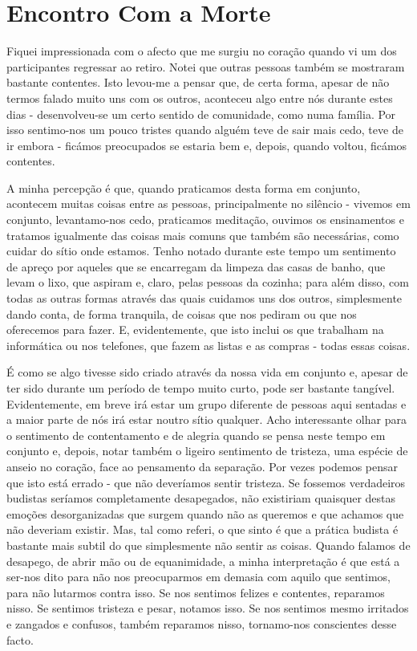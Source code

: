\chapter{Encontro Com a Morte}

Fiquei impressionada com o afecto que me surgiu no coração quando vi um
dos participantes regressar ao retiro. Notei que outras pessoas também
se mostraram bastante contentes. Isto levou-me a pensar que, de certa
forma, apesar de não termos falado muito uns com os outros, aconteceu
algo entre nós durante estes dias - desenvolveu-se um certo sentido de
comunidade, como numa família. Por isso sentimo-nos um pouco tristes
quando alguém teve de sair mais cedo, teve de ir embora - ficámos
preocupados se estaria bem e, depois, quando voltou, ficámos contentes.

A minha percepção é que, quando praticamos desta forma em conjunto,
acontecem muitas coisas entre as pessoas, principalmente no silêncio -
vivemos em conjunto, levantamo-nos cedo, praticamos meditação, ouvimos
os ensinamentos e tratamos igualmente das coisas mais comuns que também
são necessárias, como cuidar do sítio onde estamos. Tenho notado durante
este tempo um sentimento de apreço por aqueles que se encarregam da
limpeza das casas de banho, que levam o lixo, que aspiram e, claro,
pelas pessoas da cozinha; para além disso, com todas as outras formas
através das quais cuidamos uns dos outros, simplesmente dando conta, de
forma tranquila, de coisas que nos pediram ou que nos oferecemos para
fazer. E, evidentemente, que isto inclui os que trabalham na informática
ou nos telefones, que fazem as listas e as compras - todas essas coisas.

É como se algo tivesse sido criado através da nossa vida em conjunto e,
apesar de ter sido durante um período de tempo muito curto, pode ser
bastante tangível. Evidentemente, em breve irá estar um grupo diferente
de pessoas aqui sentadas e a maior parte de nós irá estar noutro sítio
qualquer. Acho interessante olhar para o sentimento de contentamento e
de alegria quando se pensa neste tempo em conjunto e, depois, notar
também o ligeiro sentimento de tristeza, uma espécie de anseio no
coração, face ao pensamento da separação. Por vezes podemos pensar que
isto está errado - que não deveríamos sentir tristeza. Se fossemos
verdadeiros budistas seríamos completamente desapegados, não existiriam
quaisquer destas emoções desorganizadas que surgem quando não as
queremos e que achamos que não deveriam existir. Mas, tal como referi, o
que sinto é que a prática budista é bastante mais subtil do que
simplesmente não sentir as coisas. Quando falamos de desapego, de abrir
mão ou de equanimidade, a minha interpretação é que está a ser-nos dito
para não nos preocuparmos em demasia com aquilo que sentimos, para não
lutarmos contra isso. Se nos sentimos felizes e contentes, reparamos
nisso. Se sentimos tristeza e pesar, notamos isso. Se nos sentimos mesmo
irritados e zangados e confusos, também reparamos nisso, tornamo-nos
conscientes desse facto.


